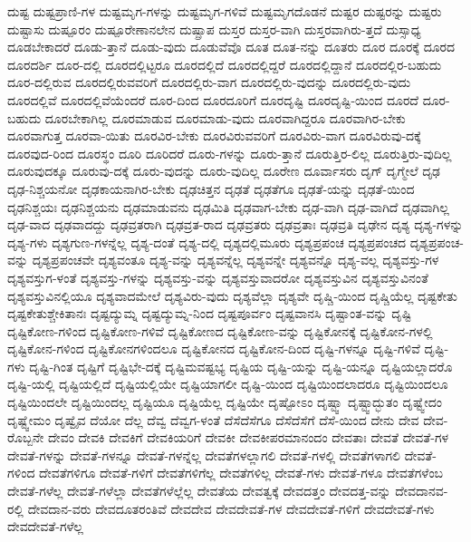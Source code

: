 {ದುಷ್ಟ
ದುಷ್ಟಪ್ರಾಣಿ-ಗಳ
ದುಷ್ಟಮೃಗ-ಗಳನ್ನು
ದುಷ್ಟಮೃಗ-ಗಳಿವೆ
ದುಷ್ಟಮೃಗದೊಡನೆ
ದುಷ್ಟರ
ದುಷ್ಟರನ್ನು
ದುಷ್ಟರು
ದುಷ್ಟಾಸು
ದುಷ್ಪೂರಂ
ದುಷ್ಪೂರೇಣಾನಲೇನ
ದುಷ್ಪ್ರಾಪ
ದುಸ್ತರ
ದುಸ್ತರ-ವಾಗಿ
ದುಸ್ತರವಾಗಿರು-ತ್ತದೆ
ದುಸ್ಸಾಧ್ಯ
ದೂಡಬೇಕಾದರೆ
ದೂಡು-ತ್ತಾನೆ
ದೂಡು-ವುದು
ದೂಡುವೆವೊ
ದೂತ
ದೂತ-ನನ್ನು
ದೂತರು
ದೂರ
ದೂರಕ್ಕೆ
ದೂರದ
ದೂರದರ್ಶಿ
ದೂರ-ದಲ್ಲಿ
ದೂರದಲ್ಲಿಟ್ಟರೂ
ದೂರದಲ್ಲಿದೆ
ದೂರದಲ್ಲಿದ್ದರೆ
ದೂರದಲ್ಲಿದ್ದಾನೆ
ದೂರದಲ್ಲಿರ-ಬಹುದು
ದೂರ-ದಲ್ಲಿರುವ
ದೂರದಲ್ಲಿರುವವರಿಗೆ
ದೂರದಲ್ಲಿರು-ವಾಗ
ದೂರದಲ್ಲಿರು-ವುದನ್ನು
ದೂರದಲ್ಲಿರು-ವುದು
ದೂರದಲ್ಲಿವೆ
ದೂರದಲ್ಲಿವೆಯೆಂದರೆ
ದೂರ-ದಿಂದ
ದೂರದೂರಿಗೆ
ದೂರದೃಷ್ಟಿ
ದೂರದೃಷ್ಟಿ-ಯಿಂದ
ದೂರದೆ
ದೂರ-ಬಹುದು
ದೂರಬೇಕಾಗಿಲ್ಲ
ದೂರಮಾಡುವ
ದೂರಮಾಡು-ವುದು
ದೂರವಾಗಿದ್ದರೂ
ದೂರವಾಗಿರ-ಬೇಕು
ದೂರವಾಗುತ್ತ
ದೂರವಾ-ಯಿತು
ದೂರವಿರ-ಬೇಕು
ದೂರವಿರುವವರಿಗೆ
ದೂರವಿರು-ವಾಗ
ದೂರವಿರುವು-ದಕ್ಕೆ
ದೂರವುದ-ರಿಂದ
ದೂರಸ್ಥಂ
ದೂರಿ
ದೂರಿದರೆ
ದೂರು-ಗಳನ್ನು
ದೂರು-ತ್ತಾನೆ
ದೂರುತ್ತಿರ-ಲಿಲ್ಲ
ದೂರುತ್ತಿರು-ವುದಿಲ್ಲ
ದೂರುವುದಕ್ಕೂ
ದೂರುವು-ದಕ್ಕೆ
ದೂರು-ವುದನ್ನು
ದೂರು-ವುದಿಲ್ಲ
ದೂರೇಣ
ದೂರ್ವಾಸರು
ದೃಗ್
ದೃಗ್ಮೇಲೆ
ದೃಢ
ದೃಢ-ನಿಶ್ಚಯನೋ
ದೃಢಕಾಯನಾಗಿರ-ಬೇಕು
ದೃಢಚಿತ್ತನ
ದೃಢತೆ
ದೃಢತೆಗೂ
ದೃಢತೆ-ಯನ್ನು
ದೃಢತೆ-ಯಿಂದ
ದೃಢನಿಶ್ಚಯಃ
ದೃಢನಿಶ್ಚಯನು
ದೃಢಮಾಡುವನು
ದೃಢಮಿತಿ
ದೃಢವಾಗ-ಬೇಕು
ದೃಢ-ವಾಗಿ
ದೃಢ-ವಾಗಿದೆ
ದೃಢವಾಗಿಲ್ಲ
ದೃಢ-ವಾದ
ದೃಢವಾದದ್ದು
ದೃಢವ್ರತರಾಗಿ
ದೃಢವ್ರತ-ರಾದ
ದೃಢವ್ರತರು
ದೃಢವ್ರತಾಃ
ದೃಢವ್ರತಿ
ದೃಢೇನ
ದೃಶ್ಯ
ದೃಶ್ಯ-ಗಳನ್ನು
ದೃಶ್ಯ-ಗಳು
ದೃಶ್ಯಗುಣ-ಗಳನ್ನೆಲ್ಲ
ದೃಶ್ಯ-ದಂತೆ
ದೃಶ್ಯ-ದಲ್ಲಿ
ದೃಶ್ಯದಲ್ಲಿಮೂರು
ದೃಶ್ಯಪ್ರಪಂಚ
ದೃಶ್ಯಪ್ರಪಂಚದ
ದೃಶ್ಯಪ್ರಪಂಚ-ವನ್ನು
ದೃಶ್ಯಪ್ರಪಂಚವೇ
ದೃಶ್ಯವಂತೂ
ದೃಶ್ಯ-ವನ್ನು
ದೃಶ್ಯವನ್ನೆಲ್ಲ
ದೃಶ್ಯವನ್ನೇ
ದೃಶ್ಯವನ್ನೊ
ದೃಶ್ಯ-ವಲ್ಲ
ದೃಶ್ಯವಸ್ತು-ಗಳ
ದೃಶ್ಯವಸ್ತುಗ-ಳಂತೆ
ದೃಶ್ಯವಸ್ತು-ಗಳನ್ನು
ದೃಶ್ಯವಸ್ತು-ವನ್ನು
ದೃಶ್ಯವಸ್ತುವಾದರೋ
ದೃಶ್ಯವಸ್ತುವಿನ
ದೃಶ್ಯವಸ್ತುವಿನಂತೆ
ದೃಶ್ಯವಸ್ತುವಿನಲ್ಲಿಯೂ
ದೃಶ್ಯವಾದಮೇಲೆ
ದೃಶ್ಯವಿರು-ವುದು
ದೃಶ್ಯವೆಲ್ಲಾ
ದೃಶ್ಯವೇ
ದೃಷ್ಚಿ-ಯಿಂದ
ದೃಷ್ಚಿಯೆಲ್ಲ
ದೃಷ್ಟಕೇತು
ದೃಷ್ಟಕೇತುಶ್ಚೇಕಿತಾನಃ
ದೃಷ್ಟದ್ಯುಮ್ನ
ದೃಷ್ಟದ್ಯುಮ್ನ-ನಿಂದ
ದೃಷ್ಟಪೂರ್ವಂ
ದೃಷ್ಟವಾನಸಿ
ದೃಷ್ಟಾಂತ-ವನ್ನು
ದೃಷ್ಟಿ
ದೃಷ್ಟಿಕೋಣ-ಗಳಿಂದ
ದೃಷ್ಟಿಕೋಣ-ಗಳಿವೆ
ದೃಷ್ಟಿಕೋಣದ
ದೃಷ್ಟಿಕೋಣ-ವನ್ನು
ದೃಷ್ಟಿಕೋನಕ್ಕೆ
ದೃಷ್ಟಿಕೋನ-ಗಳಲ್ಲಿ
ದೃಷ್ಟಿಕೋನ-ಗಳಿಂದ
ದೃಷ್ಟಿಕೋನಗಳಿಂದಲೂ
ದೃಷ್ಟಿಕೋನದ
ದೃಷ್ಟಿಕೋನ-ದಿಂದ
ದೃಷ್ಟಿ-ಗಳನ್ನೂ
ದೃಷ್ಟಿ-ಗಳಿವೆ
ದೃಷ್ಟಿ-ಗಳು
ದೃಷ್ಟಿ-ಗಿಂತ
ದೃಷ್ಟಿಗೆ
ದೃಷ್ಟಿಭೇ-ದಕ್ಕೆ
ದೃಷ್ಟಿಮವಷ್ಟಭ್ಯ
ದೃಷ್ಟಿಯ
ದೃಷ್ಟಿ-ಯನ್ನು
ದೃಷ್ಟಿ-ಯನ್ನೂ
ದೃಷ್ಟಿಯಲ್ಲಾದರೊ
ದೃಷ್ಟಿ-ಯಲ್ಲಿ
ದೃಷ್ಟಿಯಲ್ಲಿದೆ
ದೃಷ್ಟಿಯಲ್ಲಿಯೇ
ದೃಷ್ಟಿಯಾಗಲೀ
ದೃಷ್ಟಿ-ಯಿಂದ
ದೃಷ್ಟಿಯಿಂದಲಾದರೂ
ದೃಷ್ಟಿಯಿಂದಲೂ
ದೃಷ್ಟಿಯಿಂದಲೇ
ದೃಷ್ಟಿಯಿಂದಲ್ಲ
ದೃಷ್ಟಿಯೂ
ದೃಷ್ಟಿಯೆಲ್ಲ
ದೃಷ್ಟಿಯೇ
ದೃಷ್ಟೋಽಂ
ದೃಷ್ಟ್ವಾ
ದೃಷ್ಟ್ವಾದ್ಭುತಂ
ದೃಷ್ಟ್ವೇದಂ
ದೃಷ್ಟ್ವೇಮಂ
ದೃಷ್ವೈವ
ದೆಯೋ
ದೆಲ್ಲ
ದೆವ್ವ
ದೆವ್ವಗ-ಳಂತೆ
ದೆಸೆದೆಸೆಗೂ
ದೆಸೆದೆಸೆಗೆ
ದೆಸೆ-ಯಿಂದ
ದೇನು
ದೇವ
ದೇವ-ರೊಬ್ಬನೇ
ದೇವಂ
ದೇವಕಿ
ದೇವಕಿಗೆ
ದೇವಕಿಯರಿಗೆ
ದೇವಕೀ
ದೇವಕೀಪರಮಾನಂದಂ
ದೇವತಾಃ
ದೇವತೆ
ದೇವತೆ-ಗಳ
ದೇವತೆ-ಗಳನ್ನು
ದೇವತೆ-ಗಳನ್ನೂ
ದೇವತೆ-ಗಳನ್ನೆಲ್ಲ
ದೇವತೆಗಳಲ್ಲಾಗಲಿ
ದೇವತೆ-ಗಳಲ್ಲಿ
ದೇವತೆಗಳಾಗಲಿ
ದೇವತೆ-ಗಳಿಂದ
ದೇವತೆಗಳಿಗೂ
ದೇವತೆ-ಗಳಿಗೆ
ದೇವತೆಗಳಿಗೆಲ್ಲ
ದೇವತೆಗಳಿಲ್ಲ
ದೇವತೆ-ಗಳು
ದೇವತೆ-ಗಳೂ
ದೇವತೆಗಳೆಂಬ
ದೇವತೆ-ಗಳೆಲ್ಲ
ದೇವತೆ-ಗಳೆಲ್ಲಾ
ದೇವತೆಗಳೆಲ್ಲೆಲ್ಲ
ದೇವತೆಯ
ದೇವತ್ವಕ್ಕೆ
ದೇವದತ್ತಂ
ದೇವದತ್ತ-ವನ್ನು
ದೇವದಾನವ-ರಲ್ಲಿ
ದೇವದಾನ-ವರು
ದೇವದೂತರಂತಿವೆ
ದೇವದೇವ
ದೇವದೇವತೆ-ಗಳ
ದೇವದೇವತೆ-ಗಳಿಗೆ
ದೇವದೇವತೆ-ಗಳು
ದೇವದೇವತೆ-ಗಳೆಲ್ಲ
}
